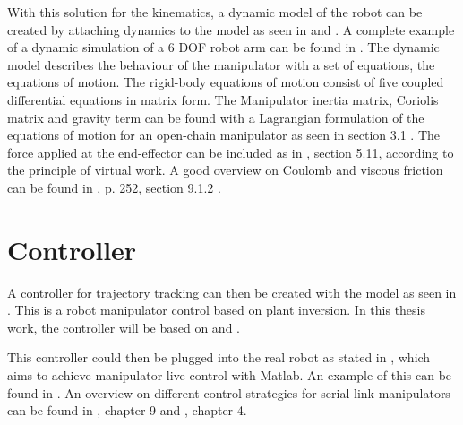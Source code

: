 With this solution for the kinematics, a dynamic model of the robot can be created by attaching dynamics to the model as seen in %
\cite{KongWei} and %
\cite{MathIntroRobManip}. A complete example of a dynamic simulation of a 6 \ac{DOF} robot arm can be found in %
\cite{CorkeRoboticVisionControl}.
The dynamic model describes the behaviour of the manipulator with a set of equations, the equations of motion.
The rigid-body equations of motion consist of five coupled differential equations in matrix form.
The Manipulator inertia matrix, Coriolis matrix and gravity term can be found with a Lagrangian formulation of the equations of motion for an open-chain manipulator as seen in %
\cite{MathIntroRobManip} section 3.1%
. The force applied at the end-effector can be included as in %
\cite{IndustrialRobotArm}, section 5.11, according to the principle of virtual work. A good overview on Coulomb and viscous friction can be found in \cite{CorkeRoboticVisionControl}, p. 252, section 9.1.2 %
. 
\medskip

\section{Controller}

A controller for trajectory tracking can then be created with the model as seen in %
\cite{evalNonlinFeedForBackControl}. %
This is a robot manipulator control based on plant inversion. In this thesis work, the controller will be based on \cite{CorkeRoboticVisionControl} and \cite{MathIntroRobManip}.

This controller could then be plugged into the real robot as stated in %
\cite{FANUCcontrolMatlab}, which aims%
to achieve manipulator live control with Matlab. An example of this can be found in %
\cite{RobotModelAnalContrexampleJamshed}.
An overview on different control strategies for serial link manipulators can be found in \cite{CorkeRoboticVisionControl}, chapter 9 and \cite{MathIntroRobManip}, chapter 4.
\bigskip



























